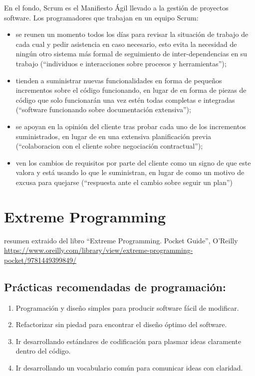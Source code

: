 \documentclass[spanish,12pt,a4paper,final,oneside]{book}
\begin{document}
En el fondo, Scrum es el Manifiesto Ágil llevado a la gestión de proyectos software. Los programadores que trabajan en un equipo Scrum:
\begin{itemize}
\item se reunen un momento todos los días para revisar la situación de trabajo de cada cual y pedir asistencia en caso necesario, esto evita la necesidad de ningún otro sistema más formal de seguimiento de inter-dependencias en su trabajo (``individuos e interacciones sobre procesos y herramientas'');
\item tienden a suministrar nuevas funcionalidades en forma de pequeños incrementos sobre el código funcionando, en lugar de en forma de piezas de código que solo funcionarán una vez estén todas completas e integradas (``software funcionando sobre documentación extensiva'');
\item se apoyan en la opinión del cliente tras probar cada uno de los incrementos suministrados, en lugar de en una extensiva planificación previa (``colaboracion con el cliente sobre negociación contractual'');
\item ven los cambios de requisitos por parte del cliente como un signo de que este valora y está usando lo que le suministran, en lugar de como un motivo de excusa para quejarse (``respuesta ante el cambio sobre seguir un plan'')
\end{itemize}

\section*{Extreme Programming}
resumen extraido del libro ``Extreme Programming. Pocket Guide'', O’Reilly
\url{https://www.oreilly.com/library/view/extreme-programming-pocket/9781449399849/}

\subsection*{Prácticas recomendadas de programación:}
\begin{enumerate}
\item Programación y diseño simples
para producir software fácil de modificar.
\item Refactorizar sin piedad
para encontrar el diseño óptimo del software.
\item Ir desarrollando estándares de codificación
para plasmar ideas claramente dentro del código.
\item Ir desarrollando un vocabulario común
para comunicar ideas con claridad.
\end{enumerate}
\end{document}

